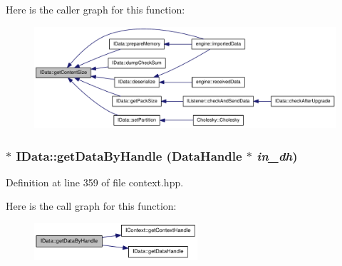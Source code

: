 Here is the caller graph for this function:\nopagebreak
\begin{figure}[H]
\begin{center}
\leavevmode
\includegraphics[width=333pt]{class_i_data_a32479396ae443e9e80f6517fd1e20f35_icgraph}
\end{center}
\end{figure}
\hypertarget{class_i_data_a78a571407788130ebe382f51c3774605}{
\subsubsection[{getDataByHandle}]{ $\ast$ IData::getDataByHandle ({\bf DataHandle} $\ast$ {\em in\_\-dh})}}
\label{class_i_data_a78a571407788130ebe382f51c3774605}


Definition at line 359 of file context.hpp.

Here is the call graph for this function:\nopagebreak
\begin{figure}[H]
\begin{center}
\leavevmode
\includegraphics[width=172pt]{class_i_data_a78a571407788130ebe382f51c3774605_cgraph}
\end{center}
\end{figure}


